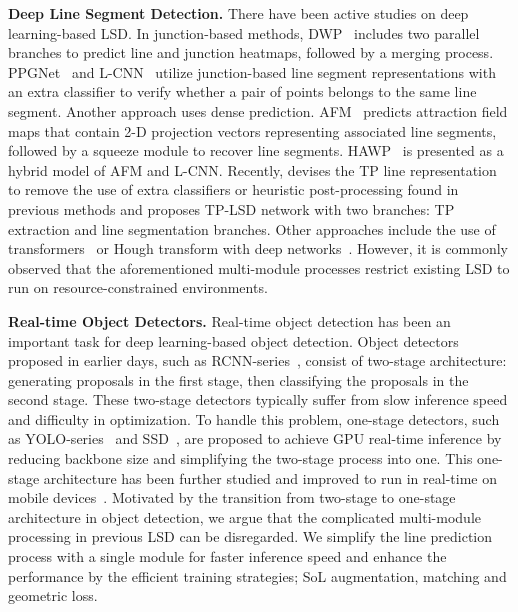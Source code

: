 \documentclass[letterpaper]{article} \usepackage{aaai22}  \usepackage{times}  \usepackage{helvet}  \usepackage{courier}  \usepackage[hyphens]{url}  \usepackage{graphicx} \urlstyle{rm} \def\UrlFont{\rm}  \usepackage{natbib}  \usepackage{caption} \DeclareCaptionStyle{ruled}{labelfont=normalfont,labelsep=colon,strut=off} \frenchspacing  \setlength{\pdfpagewidth}{8.5in}  \setlength{\pdfpageheight}{11in}  \usepackage{algorithm}
\begin{document}
\textbf{Deep Line Segment Detection. }
There have been active studies on deep learning-based LSD.
In junction-based methods, DWP~\cite{huang2018learning} includes two parallel branches to predict line and junction heatmaps, followed by a merging process.
PPGNet~\cite{zhang2019ppgnet} and L-CNN~\cite{zhou2019end} utilize junction-based line segment representations with an extra classifier to verify whether a pair of points belongs to the same line segment.
Another approach uses dense prediction.
AFM~\cite{xue2019learning} predicts attraction field maps that contain 2-D projection vectors representing associated line segments, followed by a squeeze module to recover line segments.
HAWP~\cite{xue2020holistically} is presented as a hybrid model of AFM and L-CNN.
Recently, \cite{huang2020tp} devises the TP line representation to remove the use of extra classifiers or heuristic post-processing found in previous methods and proposes TP-LSD network with two branches: TP extraction and line segmentation branches.
Other approaches include the use of transformers~\cite{xu2021line} or Hough transform with deep networks~\cite{lin2020deep}.
However, it is commonly observed that the aforementioned multi-module processes restrict existing LSD to run on resource-constrained environments.


\textbf{Real-time Object Detectors. }
Real-time object detection has been an important task for deep learning-based object detection.
Object detectors proposed in earlier days, such as RCNN-series~\cite{girshick2014rcnn,girshick2015fast,ren2015faster}, consist of two-stage architecture: generating proposals in the first stage, then classifying the proposals in the second stage.
These two-stage detectors typically suffer from slow inference speed and difficulty in optimization.
To handle this problem, one-stage detectors, such as YOLO-series~\cite{redmon2016you,redmon2017yolo9000,redmon2018yolov3} and SSD~\cite{liu2016ssd}, are proposed to achieve GPU real-time inference by reducing backbone size and simplifying the two-stage process into one.
This one-stage architecture has been further studied and improved to run in real-time on mobile devices~\cite{howard2017mobilenets,sandler2018mobilenetv2,wang2018pelee,li2018tiny}.
Motivated by the transition from two-stage to one-stage architecture in object detection, we argue that the complicated multi-module processing in previous LSD can be disregarded.
We simplify the line prediction process with a single module for faster inference speed and enhance the performance by the efficient training strategies; SoL augmentation, matching and geometric loss.
\end{document}
